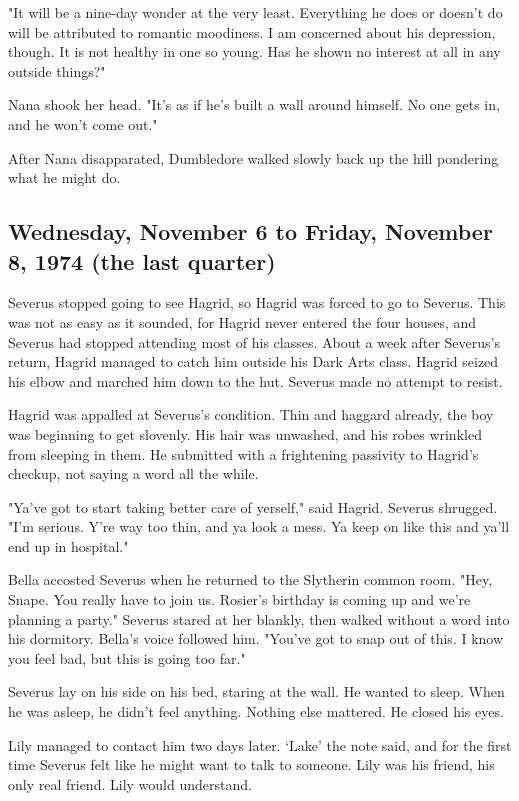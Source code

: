\documentclass[a4paper,11pt]{article}
\begin{document}
"It will be a nine-day wonder at the very least. Everything he does or doesn't do will be attributed to romantic moodiness. I am concerned about his depression, though. It is not healthy in one so young. Has he shown no interest at all in any outside things?"

Nana shook her head. "It's as if he's built a wall around himself. No one gets in, and he won't come out."

After Nana disapparated, Dumbledore walked slowly back up the hill pondering what he might do.

\subsection{Wednesday, November 6 to Friday, November 8, 1974 (the last quarter)}

Severus stopped going to see Hagrid, so Hagrid was forced to go to Severus. This was not as easy as it sounded, for Hagrid never entered the four houses, and Severus had stopped attending most of his classes. About a week after Severus's return, Hagrid managed to catch him outside his Dark Arts class. Hagrid seized his elbow and marched him down to the hut. Severus made no attempt to resist.

Hagrid was appalled at Severus's condition. Thin and haggard already, the boy was beginning to get slovenly. His hair was unwashed, and his robes wrinkled from sleeping in them. He submitted with a frightening passivity to Hagrid's checkup, not saying a word all the while.

"Ya've got to start taking better care of yerself," said Hagrid. Severus shrugged. "I'm serious. Y're way too thin, and ya look a mess. Ya keep on like this and ya'll end up in hospital."

Bella accosted Severus when he returned to the Slytherin common room. "Hey, Snape. You really have to join us. Rosier's birthday is coming up and we're planning a party." Severus stared at her blankly, then walked without a word into his dormitory. Bella's voice followed him. "You've got to snap out of this. I know you feel bad, but this is going too far."

Severus lay on his side on his bed, staring at the wall. He wanted to sleep. When he was asleep, he didn't feel anything. Nothing else mattered. He closed his eyes.

Lily managed to contact him two days later. `Lake' the note said, and for the first time Severus felt like he might want to talk to someone. Lily was his friend, his only real friend. Lily would understand.
\end{document}
